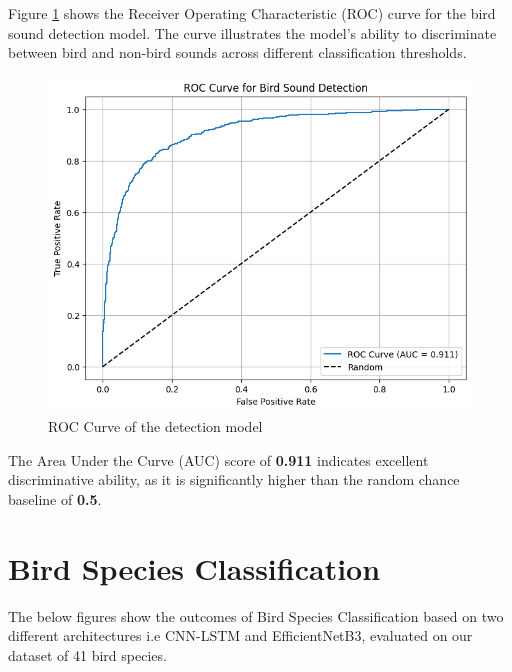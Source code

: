 Figure \ref{fig:ROC Curve} shows the Receiver Operating Characteristic (ROC) curve for the bird sound detection model. The curve illustrates the model's ability to discriminate between bird and non-bird sounds across different classification thresholds.
\begin{figure}[h!]
    \centering
    \includegraphics[scale=0.65]{images/detection_auc.png}
    \caption{ROC Curve of the detection model}
    \label{fig:ROC Curve}
\end{figure}

The Area Under the Curve (AUC) score of \textbf{0.911} indicates excellent discriminative ability, as it is significantly higher than the random chance baseline of \textbf{0.5}.
\section{Bird Species Classification}
The below figures show the outcomes of Bird Species Classification based on two different architectures i.e CNN-LSTM and EfficientNetB3, evaluated on our dataset of 41 bird species.

